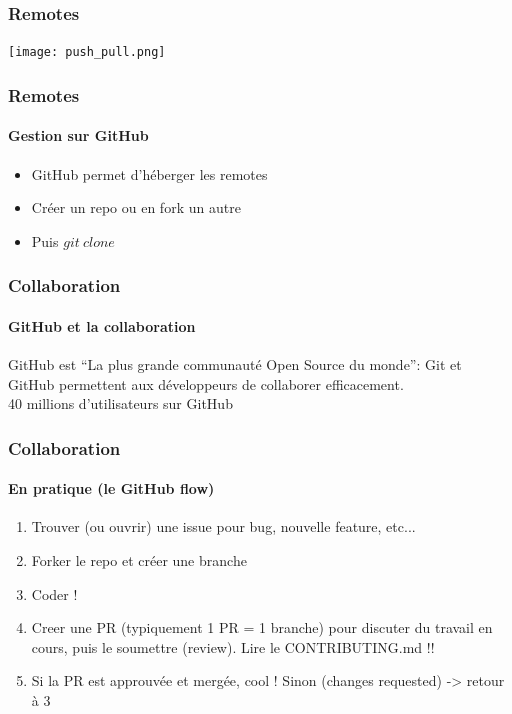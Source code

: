 \documentclass[aspectratio=169]{beamer}
\begin{document}
\begin{frame}
  \frametitle{Remotes}
  \begin{center}
    \texttt{[image: push\_pull.png]}
  \end{center}
\end{frame}

\begin{frame}
  \frametitle{Remotes}
  \framesubtitle{Gestion sur GitHub}
  \begin{itemize}
  \item GitHub permet d'héberger les remotes
  \item Créer un repo ou en fork un autre
  \item Puis $git\:clone$
  \end{itemize}
\end{frame}

\begin{frame}
  \frametitle{Collaboration}
  \framesubtitle{GitHub et la collaboration}
  \centering
  GitHub est ``La plus grande communauté Open Source du monde'': Git et GitHub permettent aux développeurs de collaborer efficacement.\\
  \vspace{10pt}
  40 millions d'utilisateurs sur GitHub
\end{frame}

\begin{frame}
  \frametitle{Collaboration}
  \framesubtitle{En pratique (le GitHub flow)}
  \begin{enumerate}
  \item Trouver (ou ouvrir) une issue pour bug, nouvelle feature, etc...
  \item Forker le repo et créer une branche
  \item Coder !
  \item Creer une PR (typiquement 1 PR = 1 branche) pour discuter du travail en cours, puis le soumettre (review). Lire le CONTRIBUTING.md !!
  \item Si la PR est approuvée et mergée, cool ! Sinon (changes requested) -> retour à 3
  \end{enumerate}
\end{frame}
\end{document}

